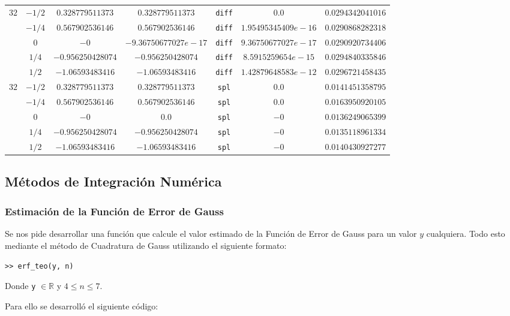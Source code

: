 \documentclass[12pt,letterpaper]{article}
\begin{document}
\begin{sidewaystable}
\begin{center}
\begin{tabular}{|c|c|c|c|c|c|c|}
		\multirow{5}{*}{$32$}
			& $-1/2$ & $0.328779511373$ & $0.328779511373$ & \verb+diff+ & $0.0$ & $0.0294342041016$ \\
			& $-1/4$ & $0.567902536146$ & $0.567902536146$ & \verb+diff+ & $1.95495345409e-16$ & $0.0290868282318$ \\
			& $0$ & $-0$ & $-9.36750677027e-17$ & \verb+diff+ & $9.36750677027e-17$ & $0.0290920734406$ \\
			& $1/4$ & $-0.956250428074$ & $-0.956250428074$ & \verb+diff+ & $8.5915259654e-15$ & $0.0294840335846$ \\
			& $1/2$ & $-1.06593483416$ & $-1.06593483416$ & \verb+diff+ & $1.42879648583e-12$ & $0.0296721458435$ \\
		\hline
		\multirow{5}{*}{$32$}
			& $-1/2$ & $0.328779511373$ & $0.328779511373$ & \verb+spl+ & $0.0$ & $0.0141451358795$ \\
			& $-1/4$ & $0.567902536146$ & $0.567902536146$ & \verb+spl+ & $0.0$ & $0.0163950920105$ \\
			& $0$ & $-0$ & $0.0$ & \verb+spl+ & $-0$ & $0.0136249065399$ \\
			& $1/4$ & $-0.956250428074$ & $-0.956250428074$ & \verb+spl+ & $-0$ & $0.0135118961334$ \\
			& $1/2$ & $-1.06593483416$ & $-1.06593483416$ & \verb+spl+ & $-0$ & $0.0140430927277$ \\
		\hline
	\end{tabular}
\end{center}
\end{sidewaystable}

\subsection{Métodos de Integración Numérica}
\subsubsection{Estimación de la Función de Error de Gauss}
Se nos pide desarrollar una función que calcule el valor estimado de la Función de Error de Gauss para un valor $y$ cualquiera. Todo esto mediante el método de Cuadratura de Gauss utilizando el siguiente formato:
\begin{center}
\verb+>> erf_teo(y, n)+
\end{center}

Donde \verb+y+ $\in \mathbb{R}$ y $4 \leq n \leq 7$.

Para ello se desarrolló el siguiente código:
\begin{verbatim}
\end{verbatim}
\end{document}
